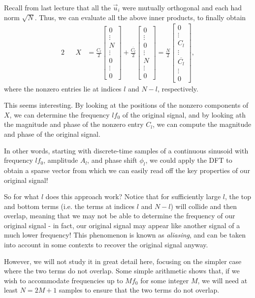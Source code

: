 \documentclass[letterpaper]{article}
\theoremstyle{remark}
\newcommand{\mat}[1]{\ensuremath{\begin{bmatrix}#1\end{bmatrix}}}
\newcommand{\eqn}[1]{\begin{alignat*}{2}#1\end{alignat*}}
\begin{document}
Recall from last lecture that all the $\vec{u}_i$ were mutually orthogonal and each had norm $\sqrt{N}$. Thus, we can evaluate all the above inner products, to finally obtain
\eqn{
    && X &= \frac{C_l}{2} \mat{0 \\ \vdots \\ N \\ \vdots \\ 0 \\ \vdots \\ 0} + \frac{\overline{C_l}}{2} \mat{0 \\ \vdots \\ 0 \\ \vdots \\ N \\ \vdots \\ 0} = \frac{N}{2} \mat{0 \\ \vdots \\ C_l \\ \vdots \\ \overline{C_l} \\ \vdots \\ 0},
}
where the nonzero entries lie at indices $l$ and $N - l$, respectively.

This seems interesting. By looking at the positions of the nonzero components of $X$, we can determine the frequency $lf_0$ of the original signal, and by looking ath the magnitude and phase of the nonzero entry $C_l$, we can compute the magnitude and phase of the original signal. 

In other words, starting with discrete-time samples of a continuous sinusoid with frequency $lf_0$, amplitude $A_l$, and phase shift $\phi_l$, we could apply the DFT to obtain a sparse vector from which we can easily read off the key properties of our original signal!

So for what $l$ does this approach work? Notice that for sufficiently large $l$, the top and bottom terms (i.e. the terms at indices $l$ and $N-l$) will collide and then overlap, meaning that we may not be able to determine the frequency of our original signal - in fact, our original signal may appear like another signal of a much lower frequency! This phenomenon is known as \emph{aliasing}, and can be taken into account in some contexts to recover the original signal anyway. 

However, we will not study it in great detail here, focusing on the simpler case where the two terms do not overlap. Some simple arithmetic shows that, if we wish to accommodate frequencies up to $Mf_0$ for some integer $M$, we will need at least $N = 2M + 1$ samples to ensure that the two terms do not overlap.
\end{document}

